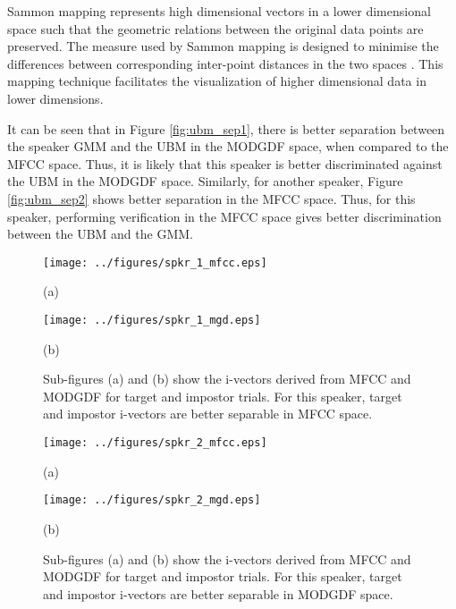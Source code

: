 \documentclass[preprint,12pt,5p]{elsarticle}
\begin{document}
Sammon mapping represents high dimensional vectors in a 
lower dimensional space such that the geometric relations between the original data points
are preserved. The measure used by Sammon mapping is designed to 
minimise the differences between corresponding inter-point distances in the two spaces 
\cite{sammon1}. This mapping technique facilitates the visualization of higher dimensional data
in lower dimensions. 

It can be seen that in Figure \ref{fig:ubm_sep1}, there is  better separation
between the speaker GMM and the UBM in the MODGDF space, when compared to the MFCC
space. Thus, it is likely that this speaker is better discriminated against the
UBM in the MODGDF space. Similarly, for another speaker, Figure
\ref{fig:ubm_sep2} shows better separation in the MFCC space. Thus, for this
speaker, performing verification in the MFCC space gives better discrimination
between the UBM and the GMM. 

\begin{figure}[h!tb]
\centering 
\begin{minipage}{0.5\textwidth}
\centering 
\texttt{[image: ../figures/spkr\_1\_mfcc.eps]}
\caption*{(a)}
\label{fig:subfig3}
\end{minipage}
\begin{minipage}{0.5\textwidth}
\centering 
\vspace{3mm}
\texttt{[image: ../figures/spkr\_1\_mgd.eps]}
\caption*{(b)}
\label{fig:subfig4}
\end{minipage}
\caption{Sub-figures (a) and (b) show the i-vectors derived from MFCC
and MODGDF for target and impostor trials. For this speaker, target and impostor
i-vectors are better separable in MFCC space.}
\label{fig:ivec_separation1}
\end{figure}

\begin{figure}[h!tb]
\centering 
\begin{minipage}{0.5\textwidth}
\centering 
\texttt{[image: ../figures/spkr\_2\_mfcc.eps]}
\caption*{(a)}
\label{fig:subfig5}
\end{minipage}
\begin{minipage}{0.5\textwidth}
\centering 
\vspace{3mm}
\texttt{[image: ../figures/spkr\_2\_mgd.eps]}
\caption*{(b)}
\label{fig:subfig6}
\end{minipage}
\caption{Sub-figures (a) and (b) show the i-vectors derived from MFCC
and MODGDF for target and impostor trials. For this speaker, target and impostor
i-vectors are better separable in MODGDF space.}
\label{fig:ivec_separation2}
\end{figure}
\end{document}
